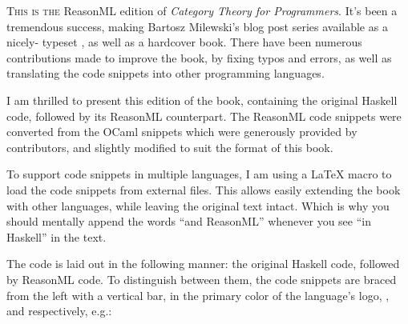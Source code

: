 
\lettrine[lhang=0.17]{T}{his is the} ReasonML edition of \emph{Category Theory for Programmers}.
It's been a tremendous success, making Bartosz Milewski's blog post series available as a nicely-
typeset , as well as a hardcover book. There have been numerous contributions made
to improve the book, by fixing typos and errors, as well as translating the code snippets into
other programming languages.

I am thrilled to present this edition of the book, containing the original Haskell code, followed by
its ReasonML counterpart. The ReasonML code snippets were converted from the OCaml snippets which were 
generously provided by  contributors,
and slightly modified to suit the format of this book.

To support code snippets in multiple languages, I am using a \LaTeX{} macro to load the code snippets
from external files. This allows easily extending the book with other languages, while leaving the 
original text intact. Which is why you should mentally append the words ``and ReasonML'' whenever you see
``in Haskell'' in the text.

The code is laid out in the following manner: the original Haskell code, followed by ReasonML code.
To distinguish between them, the code snippets are braced from the left with a vertical bar, in the primary
color of the language's logo, , 
and  respectively, e.g.:

\unskip
{}
\NoIndentAfterThis